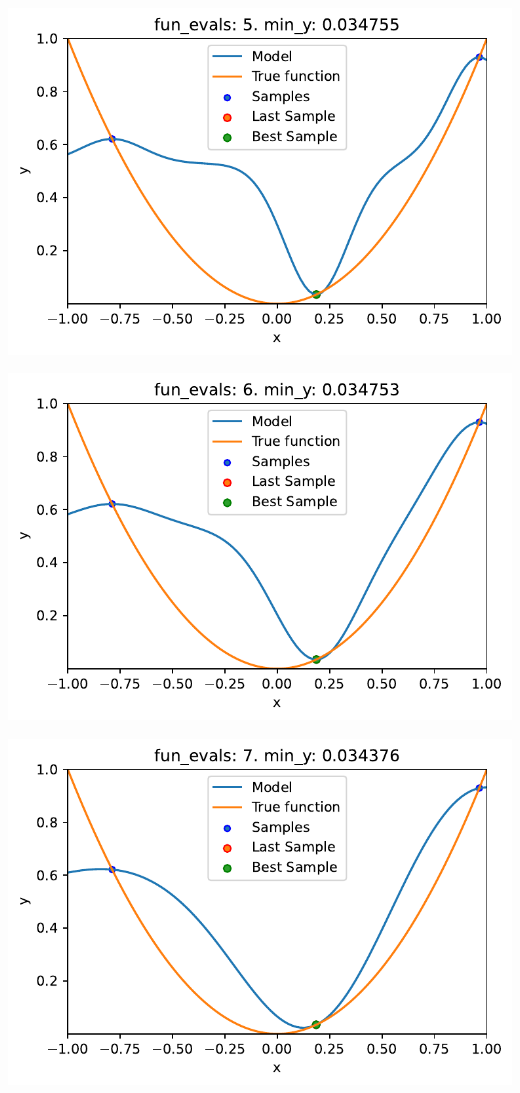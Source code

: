 \documentclass[
  letterpaper,
  DIV=11,
  numbers=noendperiod]{scrreprt}
\begin{document}
\includegraphics{010_num_spot_sklearn_surrogate_files/figure-pdf/cell-20-output-4.pdf}

\includegraphics{010_num_spot_sklearn_surrogate_files/figure-pdf/cell-20-output-5.pdf}

\includegraphics{010_num_spot_sklearn_surrogate_files/figure-pdf/cell-20-output-6.pdf}
\end{document}
